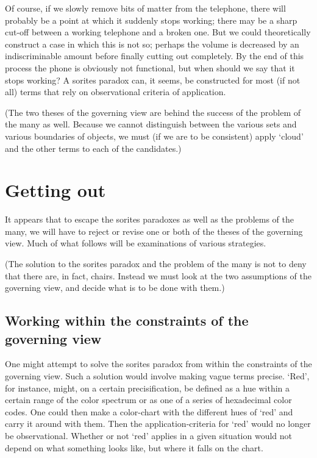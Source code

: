 \documentclass[11pt]{standalone}
\begin{document}
\begin{spacing}{1.5}
Of course, if we slowly remove bits of matter from the telephone,
there will probably be a point at which it suddenly stops working;
there may be a sharp cut-off between a working telephone and a broken
one.  But we could theoretically construct a case in which this is not
so; perhaps the volume is decreased by an indiscriminable amount
before finally cutting out completely.  By the end of this process the
phone is obviously not functional, but when should we say that it
stops working?  A sorites paradox can, it seems, be constructed for
most (if not all) terms that rely on observational criteria of
application.

(The two theses of the governing view are behind the success of the
problem of the many as well.  Because we cannot distinguish between
the various sets and various boundaries of objects, we must (if we are
to be consistent) apply `cloud' and the other terms to each of the
candidates.)

\section{Getting out}
It appears that to escape the sorites paradoxes as well as the
problems of the many, we will have to reject or revise one or both of
the theses of the governing view.  Much of what follows will be
examinations of various strategies.

(The solution to the sorites paradox and the problem of the many is
not to deny that there are, in fact, chairs.  Instead we must look at
the two assumptions of the governing view, and decide what is to be
done with them.)

\subsection{Working within the constraints of the governing view}
One might attempt to solve the sorites paradox from within the
constraints of the governing view.  Such a solution would involve
making vague terms precise.  `Red', for instance, might, on a certain
precisification, be defined as a hue within a certain range of the
color spectrum or as one of a series of hexadecimal color codes.  One
could then make a color-chart with the different hues of `red' and
carry it around with them.  Then the application-criteria for `red'
would no longer be observational.  Whether or not `red' applies in a
given situation would not depend on what something looks like, but
where it falls on the chart.


\end{spacing}
\end{document}
